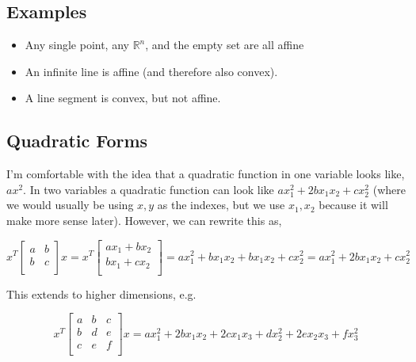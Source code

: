 \documentclass{article}
\begin{document}
\subsection{Examples}

\begin{itemize}
    \item Any single point, any $\mathbb{R}^n$, and the empty set are all affine
    \item An infinite line is affine (and therefore also convex).
    \item A line segment is convex, but not affine.
\end{itemize}

\subsection{Quadratic Forms}

I'm comfortable with the idea that a quadratic function in one variable looks like, $a x^2$.
In two variables a quadratic function can look like $a x_1^2 + 2 b x_1 x_2 + c x_2^2$ (where we would usually be using $x, y$ as the indexes, but we use $x_1, x_2$ because it will make more sense later).
However, we can rewrite this as,

\begin{equation}
    x^T \begin{bmatrix}
        a & b \\
        b & c \\
    \end{bmatrix} x = x^T  \begin{bmatrix}
        ax_1 + bx_2 \\
        bx_1 + cx_2 \\
    \end{bmatrix}  = ax_1^2 + bx_1x_2 + bx_1x_2 + cx_2^2 = ax_1^2 + 2bx_1x_2 + cx_2^2
\end{equation}

\noindent
This extends to higher dimensions, e.g.

\begin{equation}
    x^T \begin{bmatrix}
        a & b & c \\
        b & d & e \\
        c & e & f \\
    \end{bmatrix} x = a x_1^2 + 2 b x_1 x_2 + 2 c x_1 x_3 + d x_2^2 + 2 e x_2 x_3 + f x_3^2
\end{equation}
\end{document}
